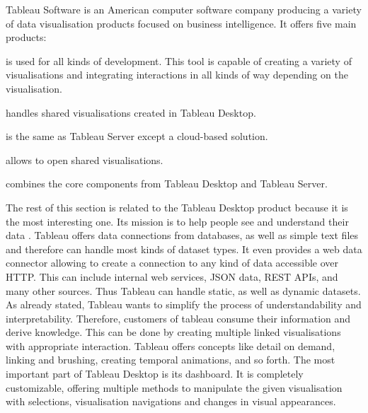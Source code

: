Tableau Software is an American computer software company producing a variety of data visualisation products focused on business intelligence. It offers five main products:
\begin{enumerate}
 is used for all kinds of development. This tool is capable of creating a variety of visualisations and integrating interactions in all kinds of way depending on the visualisation.

 handles shared visualisations created in Tableau Desktop.

 is the same as Tableau Server except a cloud-based solution.

 allows to open shared visualisations.

 combines the core components from Tableau Desktop and Tableau Server.

\end{enumerate}

The rest of this section is related to the Tableau Desktop product because it is the most interesting one. Its mission is to help people see and understand their data .
Tableau offers data connections from databases, as well as simple text files and therefore can handle most kinds of dataset types. It even provides a web data connector allowing to create a connection to any kind of data accessible over HTTP. This can include internal web services, JSON data, REST APIs, and many other sources. Thus Tableau can handle static, as well as dynamic datasets.
As \citeauthor{Murray2013} already stated, Tableau wants to simplify the process of understandability and interpretability. Therefore, customers of tableau consume their information and derive knowledge. This can be done by creating multiple linked visualisations with appropriate interaction. Tableau offers concepts like detail on demand, linking and brushing, creating temporal animations, and so forth.
The most important part of Tableau Desktop is its dashboard. It is completely customizable, offering multiple methods to manipulate the given visualisation with selections, visualisation navigations and changes in visual appearances.

